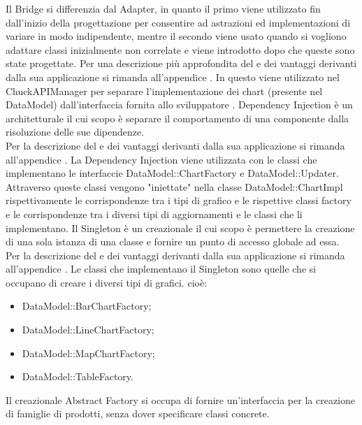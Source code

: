 			Il  Bridge si differenzia dal  Adapter, in quanto il primo viene utilizzato fin dall'inizio della progettazione per consentire ad astrazioni ed implementazioni di variare in modo indipendente, mentre il secondo viene usato quando si vogliono adattare classi inizialmente non correlate e viene introdotto dopo che queste sono state progettate.
			Per una descrizione più approfondita del  e dei vantaggi derivanti dalla sua applicazione si rimanda all'appendice .
				In  questo  viene utilizzato nel  ChuckAPIManager per separare l'implementazione dei chart (presente nel  DataModel) dall'interfaccia fornita allo sviluppatore .
			Dependency Injection è un  architetturale il cui scopo è separare il comportamento di una componente dalla risoluzione delle sue dipendenze.\\
			Per la descrizione del  e dei vantaggi derivanti dalla sua applicazione si rimanda all'appendice .
				La Dependency Injection viene utilizzata con le classi che implementano le interfaccie DataModel::ChartFactory e DataModel::Updater. Attraverso queste classi vengono "iniettate" nella classe DataModel::ChartImpl rispettivamente le corrispondenze tra i tipi di grafico e le rispettive classi factory e le corrispondenze tra i diversi tipi di aggiornamenti e le classi che li implementano.
	Il Singleton è un  creazionale il cui scopo è permettere la creazione di una sola istanza di una classe e fornire un punto di accesso globale ad essa.\\
	Per la descrizione del  e dei vantaggi derivanti dalla sua applicazione si rimanda all'appendice .
	Le classi che implementano il Singleton sono quelle che si occupano di creare i diversi tipi di grafici. cioè:
	\begin{itemize}
	\item DataModel::BarChartFactory;
	\item DataModel::LineChartFactory;
	\item DataModel::MapChartFactory;
	\item DataModel::TableFactory.
	\end{itemize}
	Il  creazionale Abstract Factory si occupa di fornire un'interfaccia per la creazione di famiglie di prodotti, senza dover specificare classi concrete. \\
